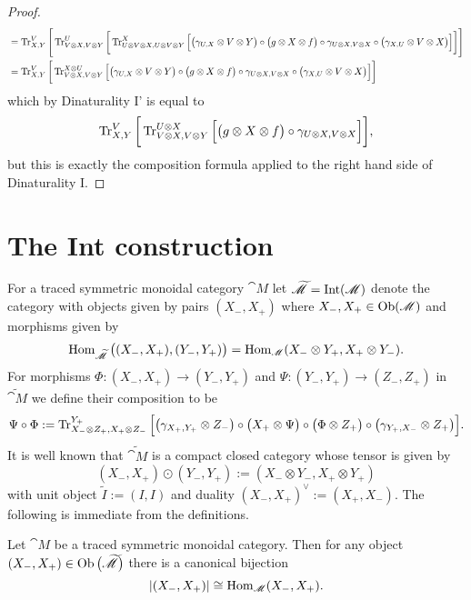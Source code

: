 \begin{proof}
{\begin{align*}
  &=\operatorname{Tr}^V_{X,Y}\Bigg[\operatorname{Tr}^U_{V\otimes X,V\otimes Y}\bigg[\operatorname{Tr}^X_{U\otimes V\otimes X,U\otimes V\otimes Y}\Big[\big(\gamma_{U,X}\otimes V\otimes Y\big)\circ\big(g\otimes X\otimes f\big)\circ\gamma_{U\otimes X, V\otimes X}\circ\big(\gamma_{X,U}\otimes V\otimes X\big)\Big]\bigg]\Bigg]\\
  &=\operatorname{Tr}^V_{X,Y}\bigg[\operatorname{Tr}^{X\otimes U}_{V\otimes X,V\otimes Y}\Big[\big(\gamma_{U,X}\otimes V\otimes Y\big)\circ\big(g\otimes X\otimes f\big)\circ\gamma_{U\otimes X, V\otimes X}\circ\big(\gamma_{X,U}\otimes V\otimes X\big)\Big]\bigg]
 \end{align*}
 which by Dinaturality I' is equal to
 \[\operatorname{Tr}^V_{X,Y}\bigg[\operatorname{Tr}^{U\otimes X}_{V\otimes X,V\otimes Y}\Big[\big(g\otimes X\otimes f\big)\circ\gamma_{U\otimes X, V\otimes X}\Big]\bigg],\]
 but this is exactly the composition formula applied to the right hand side of Dinaturality I.}%
\end{proof}

\section{The Int construction}

For a traced symmetric monoidal category $\cat{M}$ let $\widetilde{\mathscr{M}}=\operatorname{Int}(\mathscr{M})$ denote the category with objects given by pairs $(X_-,X_+)$ where $X_-,X_+\in \operatorname{Ob}(\mathscr{M})$ and morphisms given by 
\[\operatorname{Hom}_{\widetilde{\mathscr{M}}}\big((X_-,X_+),(Y_-,Y_+)\big)=\operatorname{Hom}_{\mathscr{M}}(X_-\otimes Y_+,X_+\otimes Y_-).\]
For morphisms $\Phi:(X_-,X_+)\to(Y_-,Y_+)$ and $\Psi:(Y_-,Y_+)\to(Z_-,Z_+)$ in $\widetilde{\cat{M}}$ we define their composition to be
\[\Psi\circ\Phi:=\operatorname{Tr}^{Y_+}_{X_-\otimes Z_+,X_+\otimes Z_-}\Big[\big(\gamma_{X_+,Y_+}\otimes Z_-\big)\circ\big(X_+\otimes\Psi\big)\circ\big(\Phi\otimes Z_+\big)\circ\big(\gamma_{Y_+,X_-}\otimes Z_+\big)\Big].\]
It is well known that $\widetilde{\cat{M}}$ is a compact closed category whose tensor is given by
\[(X_-,X_+)\odot(Y_-,Y_+):=(X_-\otimes Y_-,X_+\otimes Y_+)\]
with unit object $\tilde I:=(I,I)$ and duality $(X_-,X_+)^\vee:=(X_+,X_-)$.  The following is immediate from the definitions.

\begin{lemma}

Let $\cat{M}$ be a traced symmetric monoidal category.  Then for any object $(X_-,X_+)\in\operatorname{Ob}\big(\widetilde{\mathscr{M}}\big)$ there is a canonical bijection
\[|(X_-,X_+)|\cong\operatorname{Hom}_{\mathscr{M}}(X_-,X_+).\]

\end{lemma}

